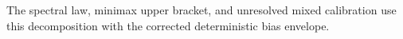 The spectral law, minimax upper bracket, and unresolved mixed calibration use this decomposition with the corrected deterministic bias envelope.